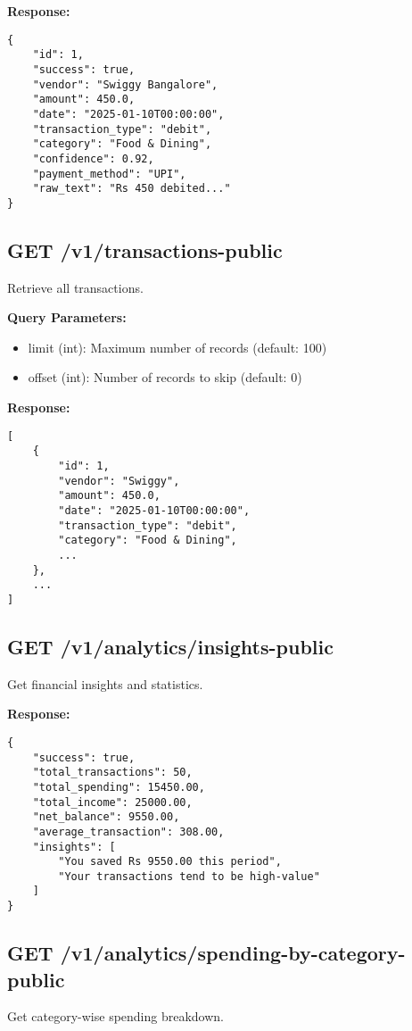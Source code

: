 \documentclass[11pt,a4paper]{report}
\begin{document}
\begin{itemize}
\textbf{Response:}
\begin{lstlisting}[]
{
    "id": 1,
    "success": true,
    "vendor": "Swiggy Bangalore",
    "amount": 450.0,
    "date": "2025-01-10T00:00:00",
    "transaction_type": "debit",
    "category": "Food & Dining",
    "confidence": 0.92,
    "payment_method": "UPI",
    "raw_text": "Rs 450 debited..."
}
\end{lstlisting}

\subsection{GET /v1/transactions-public}
Retrieve all transactions.

\textbf{Query Parameters:}
\begin{itemize}
    \item limit (int): Maximum number of records (default: 100)
    \item offset (int): Number of records to skip (default: 0)
\end{itemize}

\textbf{Response:}
\begin{lstlisting}[]
[
    {
        "id": 1,
        "vendor": "Swiggy",
        "amount": 450.0,
        "date": "2025-01-10T00:00:00",
        "transaction_type": "debit",
        "category": "Food & Dining",
        ...
    },
    ...
]
\end{lstlisting}


\subsection{GET /v1/analytics/insights-public}
Get financial insights and statistics.

\textbf{Response:}
\begin{lstlisting}[]
{
    "success": true,
    "total_transactions": 50,
    "total_spending": 15450.00,
    "total_income": 25000.00,
    "net_balance": 9550.00,
    "average_transaction": 308.00,
    "insights": [
        "You saved Rs 9550.00 this period",
        "Your transactions tend to be high-value"
    ]
}
\end{lstlisting}

\subsection{GET /v1/analytics/spending-by-category-public}
Get category-wise spending breakdown.


\end{itemize}
\end{document}
